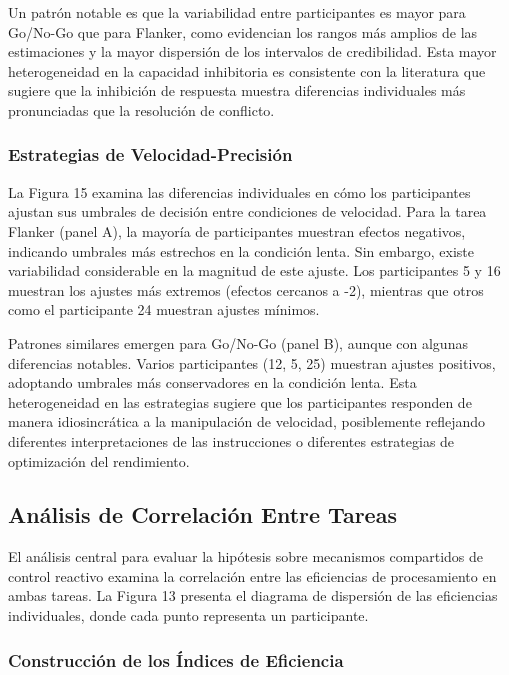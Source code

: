 \documentclass[
  spanish,
  10pt,
]{article}
\begin{document}
Un patrón notable es que la variabilidad entre participantes es mayor
para Go/No-Go que para Flanker, como evidencian los rangos más amplios
de las estimaciones y la mayor dispersión de los intervalos de
credibilidad. Esta mayor heterogeneidad en la capacidad inhibitoria es
consistente con la literatura que sugiere que la inhibición de respuesta
muestra diferencias individuales más pronunciadas que la resolución de
conflicto.

\subsubsection{Estrategias de
Velocidad-Precisión}\label{estrategias-de-velocidad-precisiuxf3n}

La Figura 15 examina las diferencias individuales en cómo los
participantes ajustan sus umbrales de decisión entre condiciones de
velocidad. Para la tarea Flanker (panel A), la mayoría de participantes
muestran efectos negativos, indicando umbrales más estrechos en la
condición lenta. Sin embargo, existe variabilidad considerable en la
magnitud de este ajuste. Los participantes 5 y 16 muestran los ajustes
más extremos (efectos cercanos a -2), mientras que otros como el
participante 24 muestran ajustes mínimos.

Patrones similares emergen para Go/No-Go (panel B), aunque con algunas
diferencias notables. Varios participantes (12, 5, 25) muestran ajustes
positivos, adoptando umbrales más conservadores en la condición lenta.
Esta heterogeneidad en las estrategias sugiere que los participantes
responden de manera idiosincrática a la manipulación de velocidad,
posiblemente reflejando diferentes interpretaciones de las instrucciones
o diferentes estrategias de optimización del rendimiento.

\subsection{Análisis de Correlación Entre
Tareas}\label{anuxe1lisis-de-correlaciuxf3n-entre-tareas}

El análisis central para evaluar la hipótesis sobre mecanismos
compartidos de control reactivo examina la correlación entre las
eficiencias de procesamiento en ambas tareas. La Figura 13 presenta el
diagrama de dispersión de las eficiencias individuales, donde cada punto
representa un participante.

\subsubsection{Construcción de los Índices de
Eficiencia}\label{construcciuxf3n-de-los-uxedndices-de-eficiencia}
\end{document}
